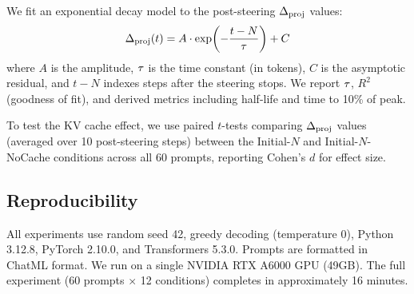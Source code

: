 We fit an exponential decay model to the post-steering $\Delta_{\mathrm{proj}}$ values:
\begin{equation}
\label{eq:decay}
\Delta_{\mathrm{proj}}(t) = A \cdot \exp\!\left(-\frac{t - N}{\tau}\right) + C
\end{equation}
where $A$ is the amplitude, $\tau$ is the time constant (in tokens), $C$ is the asymptotic residual, and $t - N$ indexes steps after the steering stops. We report $\tau$, $R^2$ (goodness of fit), and derived metrics including half-life and time to 10\% of peak.

To test the KV cache effect, we use paired $t$-tests comparing $\Delta_{\mathrm{proj}}$ values (averaged over 10 post-steering steps) between the Initial-$N$ and Initial-$N$-NoCache conditions across all 60 prompts, reporting Cohen's $d$ for effect size.

\subsection{Reproducibility}

All experiments use random seed 42, greedy decoding (temperature 0), Python 3.12.8, PyTorch 2.10.0, and Transformers 5.3.0. Prompts are formatted in ChatML format. We run on a single NVIDIA RTX A6000 GPU (49GB). The full experiment (60 prompts $\times$ 12 conditions) completes in approximately 16 minutes.
